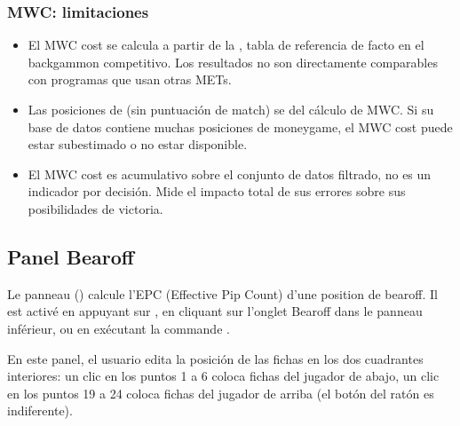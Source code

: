 \documentclass[letterpaper,10pt,spanish]{sphinxmanual}
\begin{document}
\subsubsection{MWC: limitaciones}
\label{\detokenize{manuel:mwc-limitations}}\begin{itemize}
\item {} 
\sphinxAtStartPar
El MWC cost se calcula a partir de la , tabla de referencia de facto en el backgammon competitivo. Los resultados no son directamente comparables con programas que usan otras METs.

\item {} 
\sphinxAtStartPar
Las posiciones de  (sin puntuación de match) se  del cálculo de MWC. Si su base de datos contiene muchas posiciones de money\sphinxhyphen{}game, el MWC cost puede estar subestimado o no estar disponible.

\item {} 
\sphinxAtStartPar
El MWC cost es acumulativo sobre el conjunto de datos filtrado, no es un indicador por decisión. Mide el impacto total de sus errores sobre sus posibilidades de victoria.

\end{itemize}


\subsection{Panel Bearoff}
\label{\detokenize{manuel:panneau-bearoff}}\label{\detokenize{manuel:panneau-epc}}
\sphinxAtStartPar
Le panneau  () calcule l’EPC (Effective Pip Count) d’une
position de bearoff. Il est activé en appuyant sur , en cliquant sur
l’onglet Bearoff dans le panneau inférieur, ou en exécutant la commande
.

\sphinxAtStartPar
En este panel, el usuario edita la posición de las fichas en los dos cuadrantes interiores: un clic en los puntos 1 a 6 coloca fichas del jugador de abajo, un clic en los puntos 19 a 24 coloca fichas del jugador de arriba (el botón del ratón es indiferente).
\end{document}
